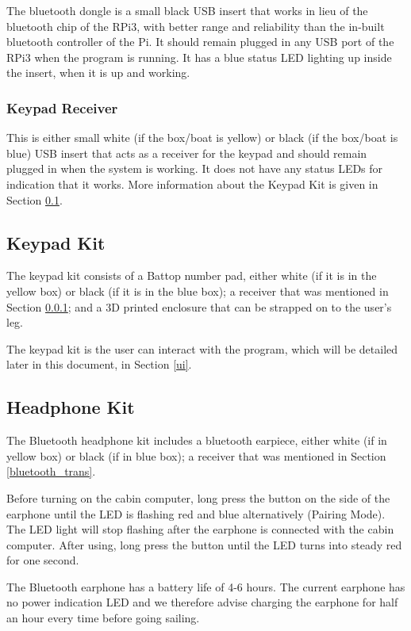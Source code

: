 \documentclass[11pt]{article}
\begin{document}
The bluetooth dongle is a small black USB insert that works in lieu of the bluetooth chip of the RPi3, with better range and reliability than the in-built bluetooth controller of the Pi. It should remain plugged in any USB port of the RPi3 when the program is running. It has a blue status LED lighting up inside the insert, when it is up and working.

\subsubsection{Keypad Receiver} \label{keypad_receive}

This is either small white (if the box/boat is yellow) or black (if the box/boat is blue) USB insert that acts as a receiver for the keypad and should remain plugged in when the system is working. It does not have any status LEDs for indication that it works. More information about the Keypad Kit is given in Section \ref{keypad_kit}.

\subsection{Keypad Kit} \label{keypad_kit}
 The keypad kit consists of a Battop number pad, either white (if it is in the yellow box) or black (if it is in the blue box); a receiver that was mentioned in Section \ref{keypad_receive}; and a 3D printed enclosure that can be strapped on to the user's leg.
 
 The keypad kit is the user can interact with the program, which will be detailed later in this document, in Section \ref{ui}.
 
\subsection{Headphone Kit}

The Bluetooth headphone kit includes a bluetooth earpiece, either white (if in yellow box) or black (if in blue box); a receiver that was mentioned in Section \ref{bluetooth_trans}. 

Before turning on the cabin computer, long press the button on the side of the earphone until the LED is flashing red and blue alternatively (Pairing Mode). The LED light will stop flashing after the earphone is connected with the cabin computer. After using, long press the button until the LED turns into steady red for one second. 

The Bluetooth earphone has a battery life of 4-6 hours. The current earphone has no power indication LED and we therefore advise charging the earphone for half an hour every time before going sailing. 
\end{document}

